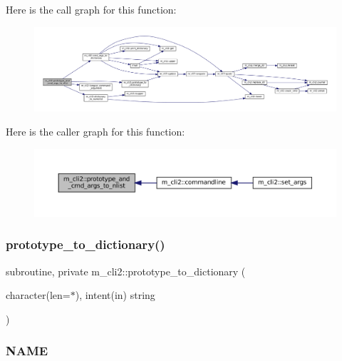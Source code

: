 Here is the call graph for this function\+:\nopagebreak
\begin{figure}[H]
\begin{center}
\leavevmode
\includegraphics[width=350pt]{namespacem__cli2_a46f31858773ff1b4cf96329a14130bf2_cgraph}
\end{center}
\end{figure}
Here is the caller graph for this function\+:\nopagebreak
\begin{figure}[H]
\begin{center}
\leavevmode
\includegraphics[width=350pt]{namespacem__cli2_a46f31858773ff1b4cf96329a14130bf2_icgraph}
\end{center}
\end{figure}
\mbox{\label{namespacem__cli2_a14896d00e509cbc32f4df993a8d6f75b}} 
\subsubsection{\texorpdfstring{prototype\+\_\+to\+\_\+dictionary()}{prototype\_to\_dictionary()}}
{\footnotesize\ttfamily subroutine, private m\+\_\+cli2\+::prototype\+\_\+to\+\_\+dictionary (\begin{DoxyParamCaption}\item[{character(len=$\ast$), intent(in)}]{string }\end{DoxyParamCaption})\hspace{0.3cm}{\ttfamily [private]}}



\subsubsection*{N\+A\+ME}

